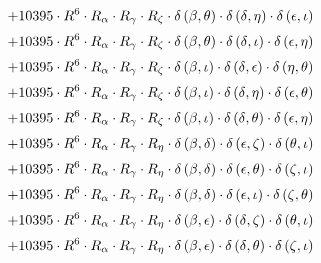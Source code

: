 \begin{subequations}
\begin{gather}
 \\[0.2em] \notag 		 + 10395 \cdot R^{6} \cdot R_{\alpha{}} \cdot R_{\gamma{}} \cdot R_{\zeta{}} \cdot \delta{}\left(\beta{}, \theta{}\right) \cdot \delta{}\left(\delta{}, \eta{}\right) \cdot \delta{}\left(\epsilon{}, \iota{}\right) 
 \\[0.2em] \notag 		 + 10395 \cdot R^{6} \cdot R_{\alpha{}} \cdot R_{\gamma{}} \cdot R_{\zeta{}} \cdot \delta{}\left(\beta{}, \theta{}\right) \cdot \delta{}\left(\delta{}, \iota{}\right) \cdot \delta{}\left(\epsilon{}, \eta{}\right) 
 \\[0.2em] \notag 		 + 10395 \cdot R^{6} \cdot R_{\alpha{}} \cdot R_{\gamma{}} \cdot R_{\zeta{}} \cdot \delta{}\left(\beta{}, \iota{}\right) \cdot \delta{}\left(\delta{}, \epsilon{}\right) \cdot \delta{}\left(\eta{}, \theta{}\right) 
 \\[0.2em] \notag 		 + 10395 \cdot R^{6} \cdot R_{\alpha{}} \cdot R_{\gamma{}} \cdot R_{\zeta{}} \cdot \delta{}\left(\beta{}, \iota{}\right) \cdot \delta{}\left(\delta{}, \eta{}\right) \cdot \delta{}\left(\epsilon{}, \theta{}\right) 
 \\[0.2em] \notag 		 + 10395 \cdot R^{6} \cdot R_{\alpha{}} \cdot R_{\gamma{}} \cdot R_{\zeta{}} \cdot \delta{}\left(\beta{}, \iota{}\right) \cdot \delta{}\left(\delta{}, \theta{}\right) \cdot \delta{}\left(\epsilon{}, \eta{}\right) 
 \\[0.2em] \notag 		 + 10395 \cdot R^{6} \cdot R_{\alpha{}} \cdot R_{\gamma{}} \cdot R_{\eta{}} \cdot \delta{}\left(\beta{}, \delta{}\right) \cdot \delta{}\left(\epsilon{}, \zeta{}\right) \cdot \delta{}\left(\theta{}, \iota{}\right) 
 \\[0.2em] \notag 		 + 10395 \cdot R^{6} \cdot R_{\alpha{}} \cdot R_{\gamma{}} \cdot R_{\eta{}} \cdot \delta{}\left(\beta{}, \delta{}\right) \cdot \delta{}\left(\epsilon{}, \theta{}\right) \cdot \delta{}\left(\zeta{}, \iota{}\right) 
 \\[0.2em] \notag 		 + 10395 \cdot R^{6} \cdot R_{\alpha{}} \cdot R_{\gamma{}} \cdot R_{\eta{}} \cdot \delta{}\left(\beta{}, \delta{}\right) \cdot \delta{}\left(\epsilon{}, \iota{}\right) \cdot \delta{}\left(\zeta{}, \theta{}\right) 
 \\[0.2em] \notag 		 + 10395 \cdot R^{6} \cdot R_{\alpha{}} \cdot R_{\gamma{}} \cdot R_{\eta{}} \cdot \delta{}\left(\beta{}, \epsilon{}\right) \cdot \delta{}\left(\delta{}, \zeta{}\right) \cdot \delta{}\left(\theta{}, \iota{}\right) 
 \\[0.2em] \notag 		 + 10395 \cdot R^{6} \cdot R_{\alpha{}} \cdot R_{\gamma{}} \cdot R_{\eta{}} \cdot \delta{}\left(\beta{}, \epsilon{}\right) \cdot \delta{}\left(\delta{}, \theta{}\right) \cdot \delta{}\left(\zeta{}, \iota{}\right) 

\end{gather}
\end{subequations}
